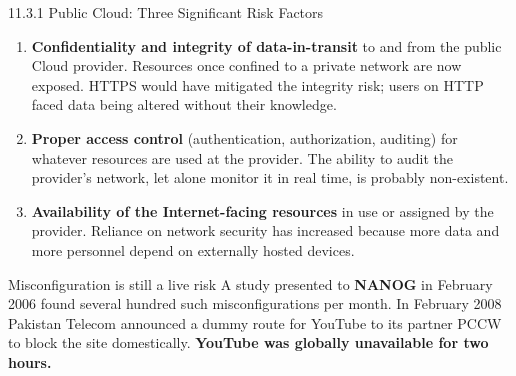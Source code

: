 \documentclass[11pt,aspectratio=169]{beamer}
\newcommand{\kw}[1]{\textbf{\color{accent}#1}}
\begin{document}
\begin{frame}{11.3.1 Public Cloud: Three Significant Risk Factors}
  \begin{enumerate}\small\setlength{\itemsep}{0.55em}
    \item \kw{Confidentiality and integrity of data-in-transit} to and from the
          public Cloud provider. Resources once confined to a private network
          are now exposed. HTTPS would have mitigated the integrity risk;
          users on HTTP faced data being altered without their knowledge.
    \item \kw{Proper access control} (authentication, authorization, auditing)
          for whatever resources are used at the provider. The ability to audit
          the provider's network, let alone monitor it in real time, is
          probably non-existent.
    \item \kw{Availability of the Internet-facing resources} in use or assigned
          by the provider. Reliance on network security has increased because
          more data and more personnel depend on externally hosted devices.
  \end{enumerate}
  \vspace{0.5em}

  \begin{alertblock}{Misconfiguration is still a live risk}
    \scriptsize
    A study presented to \kw{NANOG} in February 2006 found several hundred such
    misconfigurations per month. In February 2008 Pakistan Telecom announced a
    dummy route for YouTube to its partner PCCW to block the site domestically.
    \kw{YouTube was globally unavailable for two hours.}
  \end{alertblock}
\end{frame}
\end{document}
